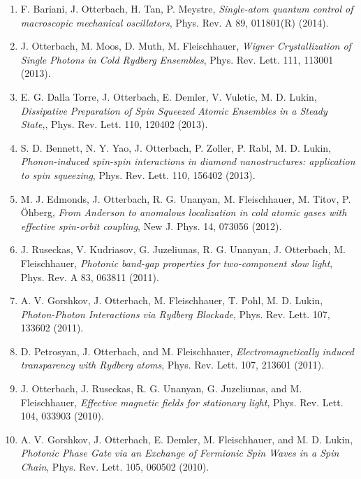 \documentclass[10pt,centered]{./res} %
\begin{document}
\begin{resume}
\begin{enumerate}
  \item F. Bariani, J. Otterbach, H. Tan, P. Meystre, \textit{Single-atom quantum control of macroscopic mechanical oscillators}, Phys. Rev. A 89, 011801(R) (2014).
  
  \item J. Otterbach, M. Moos, D. Muth, M. Fleischhauer, \textit{Wigner Crystallization of Single Photons in Cold Rydberg Ensembles}, Phys. Rev. Lett. 111, 113001 (2013).
  
  \item E. G. Dalla Torre, J. Otterbach, E. Demler, V. Vuletic, M. D. Lukin, \textit{Dissipative Preparation of Spin Squeezed Atomic Ensembles in a Steady State},, Phys. Rev. Lett. 110, 120402 (2013).
  
  \item S. D. Bennett, N. Y. Yao, J. Otterbach, P. Zoller, P. Rabl, M. D. Lukin, \textit{Phonon-induced spin-spin interactions in diamond nanostructures: application to spin squeezing}, Phys. Rev. Lett. 110, 156402 (2013).
  
  \item M. J. Edmonds, J. Otterbach, R. G. Unanyan, M. Fleischhauer, M. Titov, P. Öhberg, \textit{From Anderson to anomalous localization in cold atomic gases with effective spin-orbit coupling}, New J. Phys. 14, 073056 (2012).
  
  \item J. Ruseckas, V. Kudriasov, G. Juzeliunas, R. G. Unanyan, J. Otterbach, M. Fleischhauer, \textit{Photonic band-gap properties for two-component slow light}, Phys. Rev. A 83, 063811 (2011).
  
  \item A. V. Gorshkov, J. Otterbach, M. Fleischhauer, T. Pohl, M. D. Lukin, \textit{Photon-Photon Interactions via Rydberg Blockade}, Phys. Rev. Lett. 107, 133602 (2011).
  
  \item D. Petrosyan, J. Otterbach, and M. Fleischhauer, \textit{Electromagnetically induced transparency with Rydberg atoms}, Phys. Rev. Lett. 107, 213601 (2011).
  
  \item J. Otterbach, J. Ruseckas, R. G. Unanyan, G. Juzeliunas, and M. Fleischhauer, \textit{Effective magnetic fields for stationary light}, Phys. Rev. Lett. 104, 033903 (2010).
  
  \item A. V. Gorshkov, J. Otterbach, E. Demler, M. Fleischhauer, and M. D. Lukin, \textit{Photonic Phase Gate via an Exchange of Fermionic Spin Waves in a Spin Chain}, Phys. Rev. Lett. 105, 060502 (2010).
  

\end{enumerate}
\end{resume}
\end{document}
